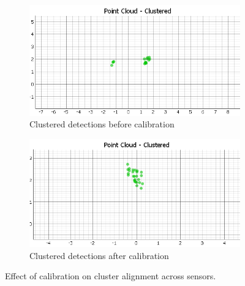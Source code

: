 \begin{figure}[ht]
    \centering
    \begin{subfigure}[b]{0.3\textwidth}
        \includegraphics[width=\textwidth]{images/dualSensorCalibCluster_2mts.png}
        \caption{Clustered detections before calibration}
    \end{subfigure}
    \hfill
    \begin{subfigure}[b]{0.3\textwidth}
        \includegraphics[width=\textwidth]{images/AFTERdualSensorCalibCluster_2mts.png}
        \caption{Clustered detections after calibration}
    \end{subfigure}
    \caption{Effect of calibration on cluster alignment across sensors.}
    \label{fig:dualSensorCalib_clusterComparison}
\end{figure}

